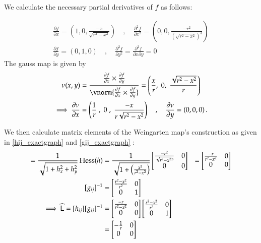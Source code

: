       
      We calculate the necessary partial derivatives of $f$ as follows:
      
      \begin{gather}
      \frac{\partial f}{\partial x} = \left(1, 0, \frac{-x}{\sqrt{r^2 - x^2}}\right)
      \quad , \quad
      \frac{\partial^2 f}{\partial x^2} = \left(0, 0, \frac{-r^2}{\left(\sqrt{r^2 - x^2}\right)^3}\right) \\
      \frac{\partial f}{\partial y} = \left(0, 1, 0\right)
      \quad , \quad
      \frac{\partial^2 f}{\partial y^2} = \frac{\partial^2 f}{\partial x \partial y} = 0
      \end{gather}
      The gauss map is given by
      \begin{gather}
      \nu(x,y) = \frac{\frac{\partial f}{\partial x} \times \frac{\partial f}{\partial y}}
      {\vnorm{\frac{\partial f}{\partial x} \times \frac{\partial f}{\partial y}}}
      = \left( \frac{x}{r} ,\; 0 ,\; \frac{\sqrt{r^2 - x^2}}{r} \right) \\
	  \implies
	  \frac{\partial \nu}{\partial x}
		  = \left(\frac{1}{r} \;,\; 0\;,\; \frac{-x}{r\sqrt{r^2-x^2}}\right)
		  \quad , \quad \frac{\partial \nu}{\partial y} = \left(0,0,0\right).
      \end{gather}
      
      We then calculate matrix elements of the Weingarten map's construction as given in
      \cref{hij_exactgraph} and \cref{gij_exactgraph} :
      \begin{align}
      [h_{ij}] = \frac{1}{\sqrt{1+h_x^2 + h_y^2}} \,  \Hess (h)
		       &= \frac{1}{\sqrt{1+\left(\frac{x^2}{r^2-x^2}\right)}}
		       \begin{bmatrix}
		       \frac{-r^2}{\sqrt{r^2 - x^2}^3} & 0 \\
			     0 & 0
		       \end{bmatrix} 
		       &= \begin{bmatrix}
		       \frac{-r}{r^2 - x^2} & 0 \\
		       0 & 0
		       \end{bmatrix} \\
		       [g_{ij}]^{-1} &= \begin{bmatrix} \frac{r^2 - x^2}{r^2} & 0 \\ 0 & 1 \end{bmatrix} \\
		       \implies \weinmat = [h_{ij}]	[g_{ij}]^{-1} &=
		       \begin{bmatrix}
		       \frac{-r}{r^2 - x^2} & 0 \\
		       0 & 0
		       \end{bmatrix} \begin{bmatrix} \frac{r^2 - x^2}{r^2} & 0 \\ 0 & 1 \end{bmatrix} \\
		       &= \begin{bmatrix} - \frac{1}{r} & 0 \\ 0 & 0 	\end{bmatrix}	       	
      \end{align}
      
